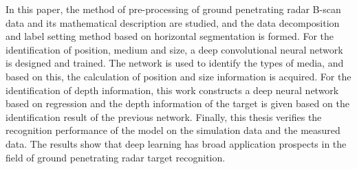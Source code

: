 \begin{englishabstract}
	In this paper, the method of pre-processing of ground penetrating radar B-scan data and its mathematical description are studied, and the data decomposition and label setting method based on horizontal segmentation is formed. For the identification of position, medium and size, a deep convolutional neural network is designed and trained. The network is used to identify the types of media, and based on this, the calculation of position and size information is acquired. For the identification of depth information, this work constructs a deep neural network based on regression and the depth information of the target is given based on the identification result of the previous network. Finally, this thesis verifies the recognition performance of the model on the simulation data and the measured data. The results show that deep learning has broad application prospects in the field of ground penetrating radar target recognition.
	
\end{englishabstract}


